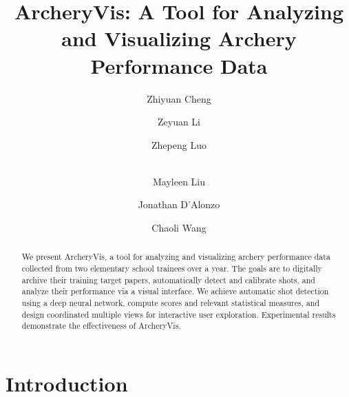 \documentclass[runningheads]{llncs}
\begin{document}
%
\title{ArcheryVis: A Tool for Analyzing and Visualizing Archery Performance Data}
%
%
\author{Zhiyuan Cheng \and
Zeyuan Li \and
Zhepeng Luo \and \\
Mayleen Liu \and 
Jonathan D'Alonzo \and 
Chaoli Wang%
}
%
%

%
\maketitle              %
%
\begin{abstract}
We present ArcheryVis, a tool for analyzing and visualizing archery performance data collected from two elementary school trainees over a year. The goals are to digitally archive their training target papers, automatically detect and calibrate shots, and analyze their performance via a visual interface. We achieve automatic shot detection using a deep neural network, compute scores and relevant statistical measures, and design coordinated multiple views for interactive user exploration. Experimental results demonstrate the effectiveness of ArcheryVis.

\end{abstract}
% 

\section{Introduction}
\end{document}
